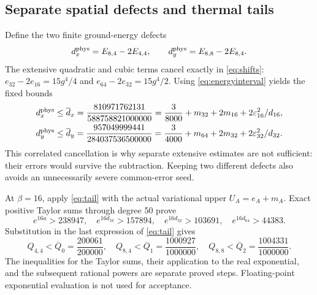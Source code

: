 \subsection{Separate spatial defects and thermal tails}
Define the two finite ground-energy defects
\[
 d_x^{\rm phys}=E_{8,4}-2E_{4,4},\qquad
 d_y^{\rm phys}=E_{8,8}-2E_{8,4}.
\]
The extensive quadratic and cubic terms cancel exactly in \eqref{eq:shifts}:
$e_{32}-2e_{16}=15g^4/4$ and $e_{64}-2e_{32}=15g^4/2$.
Using \eqref{eq:energyinterval} yields the fixed bounds
\begin{align}\label{eq:dxdy}
 d_x^{\rm phys}&\le\overline d_x
 =\frac{810971762131}{588758821000000}
 =\frac3{8000}+m_{32}+2m_{16}+2\varepsilon_{16}^2/d_{16},\\
 d_y^{\rm phys}&\le\overline d_y
 =\frac{957049999441}{284037536500000}
 =\frac3{4000}+m_{64}+2m_{32}+2\varepsilon_{32}^2/d_{32}.\notag
\end{align}
This correlated cancellation is why separate extensive estimates are not
sufficient: their errors would survive the subtraction. Keeping two different
defects also avoids an unnecessarily severe common-error seed.

At $\beta=16$, apply \eqref{eq:tail} with the actual variational upper
$U_A=e_A+m_A$. Exact positive Taylor sums through degree 50 prove
\[
 e^{16a}>238947,\quad e^{16d_{16}}>157894,\quad
 e^{16d_{32}}>103691,\quad e^{16d_{64}}>44383.
\]
Substitution in the last expression of \eqref{eq:tail} gives
\begin{equation}\label{eq:Qbounds}
 Q_{4,4}<\overline Q_0=\frac{200061}{200000},\quad
 Q_{8,4}<\overline Q_1=\frac{1000927}{1000000},\quad
 Q_{8,8}<\overline Q_2=\frac{1004331}{1000000}.
\end{equation}
The inequalities for the Taylor sums, their application to the real exponential,
and the subsequent rational powers are separate proved steps. Floating-point
exponential evaluation is not used for acceptance.

